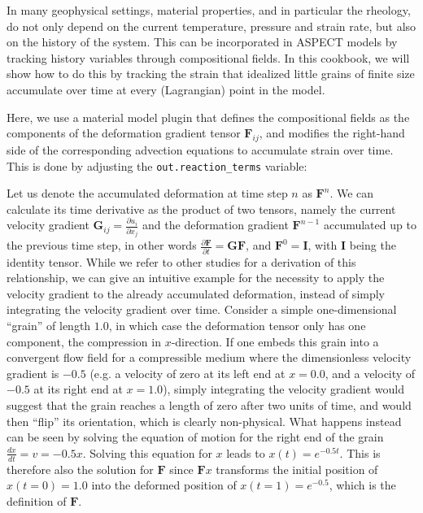 \documentclass{article}
\newcommand{\aspect}{\textsc{ASPECT}}
\begin{document}
In many geophysical settings, material properties, and in particular the rheology, do not only depend
on the current temperature, pressure and strain rate, but also on the history of the system. 
This can be incorporated in \aspect{} models by tracking history variables through compositional fields. 
In this cookbook, we will show how to do this by tracking the strain that idealized little grains of finite size accumulate over time at every 
(Lagrangian) point in the model.

Here, we use a material model plugin that defines the compositional fields as the components of the deformation 
gradient tensor $\mathbf F_{ij}$, and modifies the right-hand side of 
the corresponding advection equations to accumulate strain over time. This is done by adjusting the 
\verb!out.reaction_terms! variable:


Let us denote the accumulated deformation at time step $n$ as $\mathbf F^n$. We can calculate its time derivative  
as the product of two tensors, namely the current velocity gradient $\mathbf G_{ij} = \frac{\partial u_i}{\partial x_j}$ and the deformation gradient $\mathbf F^{n-1}$ accumulated up to the previous time step, in other words $\frac{\partial \mathbf F}{\partial t} = \mathbf G \mathbf F$, and $\mathbf F^0 = \mathbf I$, with $\mathbf I$ being the identity tensor.
While we refer to other studies \cite{McKenzie1983, dahlen1998theoretical, Becker2003} for a derivation of
this relationship, we can give an intuitive example for the necessity to apply the velocity gradient to the already accumulated deformation, instead of simply integrating the velocity gradient over time. Consider a simple one-dimensional ``grain'' of length $1.0$, in which case the deformation tensor only has one component, the compression in $x$-direction. If one embeds this grain into a convergent flow field for a compressible medium where the dimensionless velocity gradient is $-0.5$  (e.g. a velocity of zero at its left end at $x=0.0$, and a velocity of $-0.5$ at its right end at $x=1.0$), simply integrating the velocity gradient would suggest that the grain reaches a length of zero after two units of time, and would then ``flip'' its orientation, which is clearly non-physical.
What happens instead can be seen by solving the equation of motion for the right end of the grain $\frac{dx}{dt} = v = -0.5 x$. Solving this equation for $x$ leads to $x(t) = e^{-0.5t}$. This is therefore also the solution for $\mathbf F$ since $\mathbf F x$ transforms the initial position of $x(t=0)=1.0$ into the deformed position of $x(t=1) = e^{-0.5}$, which is the definition of $\mathbf F$.
\end{document}
